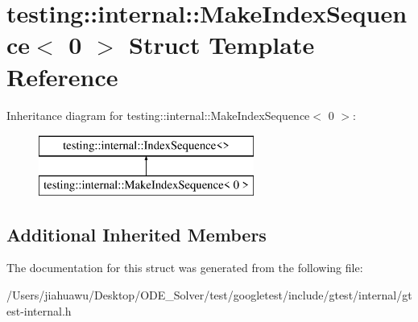 \hypertarget{structtesting_1_1internal_1_1_make_index_sequence_3_010_01_4}{}\section{testing\+:\+:internal\+:\+:Make\+Index\+Sequence$<$ 0 $>$ Struct Template Reference}
\label{structtesting_1_1internal_1_1_make_index_sequence_3_010_01_4}
Inheritance diagram for testing\+:\+:internal\+:\+:Make\+Index\+Sequence$<$ 0 $>$\+:\begin{figure}[H]
\begin{center}
\leavevmode
\includegraphics[height=2.000000cm]{structtesting_1_1internal_1_1_make_index_sequence_3_010_01_4}
\end{center}
\end{figure}
\subsection*{Additional Inherited Members}


The documentation for this struct was generated from the following file\+:\begin{DoxyCompactItemize}
\item 
/\+Users/jiahuawu/\+Desktop/\+O\+D\+E\+\_\+\+Solver/test/googletest/include/gtest/internal/gtest-\/internal.\+h\end{DoxyCompactItemize}
